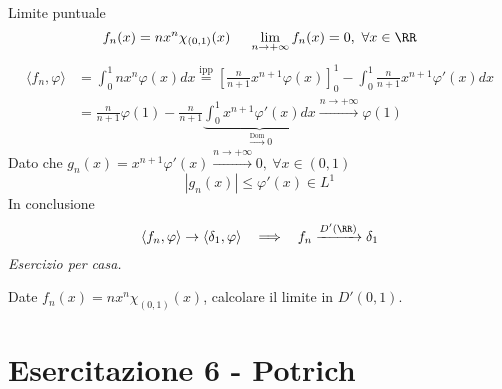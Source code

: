 \Soluzione

Limite puntuale
\begin{equation*}
f_{n} (x) = nx^{n} \chi_{(0, 1)} (x)\ \ \ \ \lim\limits_{n\rightarrow + \infty} f_{n}(x) = 0, \ \forall x\in \RR
\end{equation*}
\begin{equation*}
\begin{aligned}
\langle f_{n}, \varphi \rangle & = \int^{1}_{0} nx^{n} \varphi (x) dx\overset{\text{ipp}}{=}\left[\frac{n}{n + 1} x^{n + 1} \varphi (x)\right]^{1}_{0} - \int^{1}_{0}\frac{n}{n + 1} x^{n + 1} \varphi'(x) dx\\
 & = \frac{n}{n + 1} \varphi (1) - \frac{n}{n + 1}\underbrace{\int^{1}_{0} x^{n + 1} \varphi'(x) dx}_{\xrightarrow{\text{Dom}} 0}\xrightarrow{n\rightarrow + \infty} \varphi (1)
\end{aligned}
\end{equation*}
Dato che $g_{n}(x) = x^{n + 1} \varphi'(x)\xrightarrow{n\rightarrow + \infty} 0, \ \forall x\in (0, 1)$
\begin{equation*}
| g_{n}(x)| \leq \varphi'(x) \in L^{1}
\end{equation*}
In conclusione
\begin{equation*}
\langle f_{n}, \varphi \rangle \rightarrow \langle \delta_{1}, \varphi \rangle \ \ \implies \ \ f_{n}\xrightarrow{D'(\RR)} \delta_{1}
\end{equation*}
\textit{Esercizio per casa.}

Date $f_{n}(x) = nx^{n} \chi_{(0, 1)}(x)$, calcolare il limite in $D'(0, 1)$.
\chapter{Esercitazione 6 - Potrich}

\ParteEsercizi

\Esercizio{}

